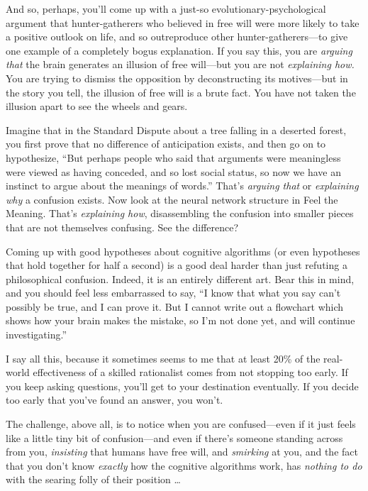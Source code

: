 {
 And so, perhaps, you'll come up with a just-so
evolutionary-psychological argument that hunter-gatherers who believed
in free will were more likely to take a positive outlook on life, and
so outreproduce other hunter-gatherers---to give one example of a
completely bogus explanation. If you say this, you are \textit{arguing
that} the brain generates an illusion of free will---but you are not
\textit{explaining how.} You are trying to dismiss the opposition by
deconstructing its motives---but in the story you tell, the illusion of
free will is a brute fact. You have not taken the illusion apart to see
the wheels and gears.}

{
 Imagine that in the Standard Dispute about a tree falling in a
deserted forest, you first prove that no difference of anticipation
exists, and then go on to hypothesize, ``But perhaps
people who said that arguments were meaningless were viewed as having
conceded, and so lost social status, so now we have an instinct to
argue about the meanings of words.''
That's \textit{arguing that} or \textit{explaining why}
a confusion exists. Now look at the neural network structure in Feel
the Meaning. That's \textit{explaining how},
disassembling the confusion into smaller pieces that are not themselves
confusing. See the difference?}

{
 Coming up with good hypotheses about cognitive algorithms (or even
hypotheses that hold together for half a second) is a good deal harder
than just refuting a philosophical confusion. Indeed, it is an entirely
different art. Bear this in mind, and you should feel less embarrassed
to say, ``I know that what you say
can't possibly be true, and I can prove it. But I
cannot write out a flowchart which shows how your brain makes the
mistake, so I'm not done yet, and will continue
investigating.''}

{
 I say all this, because it sometimes seems to me that at least
20\% of the real-world effectiveness of a skilled rationalist comes
from not stopping too early. If you keep asking questions,
you'll get to your destination eventually. If you
decide too early that you've found an answer, you
won't.}

{
 The challenge, above all, is to notice when you are
confused---even if it just feels like a little tiny bit of
confusion---and even if there's someone standing across
from you, \textit{insisting} that humans have free will, and
\textit{smirking} at you, and the fact that you don't
know \textit{exactly} how the cognitive algorithms work, has
\textit{nothing to do} with the searing folly of their position \ldots}

